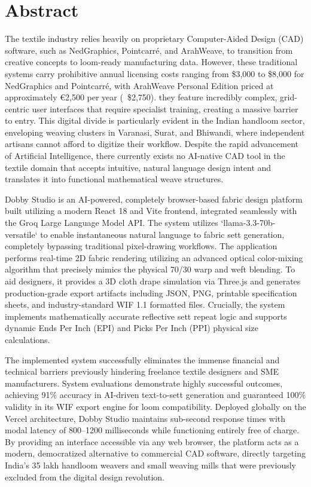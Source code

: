 \chapter*{Abstract}

The textile industry relies heavily on proprietary Computer-Aided Design (CAD) software, such as NedGraphics, Pointcarré, and ArahWeave, to transition from creative concepts to loom-ready manufacturing data. However, these traditional systems carry prohibitive annual licensing costs ranging from \$3,000 to \$8,000 for NedGraphics and Pointcarré, with ArahWeave Personal Edition priced at approximately €2,500 per year (~\$2,750). they feature incredibly complex, grid-centric user interfaces that require specialist training, creating a massive barrier to entry. This digital divide is particularly evident in the Indian handloom sector, enveloping weaving clusters in Varanasi, Surat, and Bhiwandi, where independent artisans cannot afford to digitize their workflow. Despite the rapid advancement of Artificial Intelligence, there currently exists no AI-native CAD tool in the textile domain that accepts intuitive, natural language design intent and translates it into functional mathematical weave structures.

Dobby Studio is an AI-powered, completely browser-based fabric design platform built utilizing a modern React 18 and Vite frontend, integrated seamlessly with the Groq Large Language Model API. The system utilizes `llama-3.3-70b-versatile` to enable instantaneous natural language to fabric sett generation, completely bypassing traditional pixel-drawing workflows. The application performs real-time 2D fabric rendering utilizing an advanced optical color-mixing algorithm that precisely mimics the physical 70/30 warp and weft blending. To aid designers, it provides a 3D cloth drape simulation via Three.js and generates production-grade export artifacts including JSON, PNG, printable specification sheets, and industry-standard WIF 1.1 formatted files. Crucially, the system implements mathematically accurate reflective sett repeat logic and supports dynamic Ends Per Inch (EPI) and Picks Per Inch (PPI) physical size calculations.

The implemented system successfully eliminates the immense financial and technical barriers previously hindering freelance textile designers and SME manufacturers. System evaluations demonstrate highly successful outcomes, achieving 91\% accuracy in AI-driven text-to-sett generation and guaranteed 100\% validity in its WIF export engine for loom compatibility. Deployed globally on the Vercel architecture, Dobby Studio maintains sub-second response times with modal latency of 800–1200 milliseconds while functioning entirely free of charge. By providing an interface accessible via any web browser, the platform acts as a modern, democratized alternative to commercial CAD software, directly targeting India's 35 lakh handloom weavers and small weaving mills that were previously excluded from the digital design revolution.
